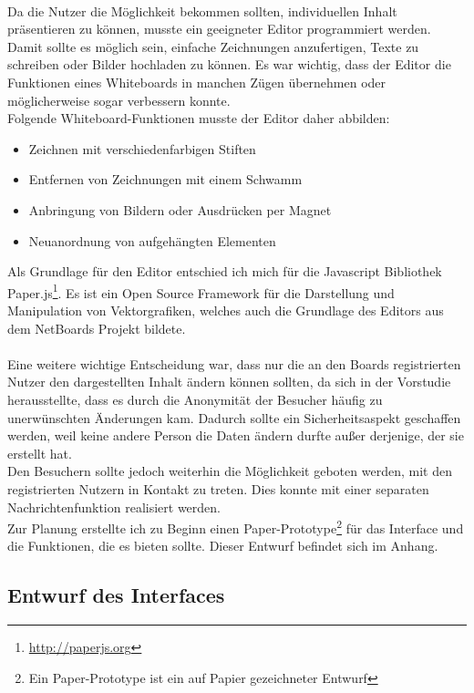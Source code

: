 \\
Da die Nutzer die Möglichkeit bekommen sollten, individuellen Inhalt präsentieren zu können, musste ein geeigneter Editor programmiert werden.
Damit sollte es möglich sein, einfache Zeichnungen anzufertigen, Texte zu schreiben oder Bilder hochladen zu können.
Es war wichtig, dass der Editor die Funktionen eines Whiteboards in manchen Zügen übernehmen oder möglicherweise sogar verbessern konnte.
\\
Folgende Whiteboard-Funktionen musste der Editor daher abbilden:
\begin{itemize}
  \item Zeichnen mit verschiedenfarbigen Stiften
  \item Entfernen von Zeichnungen mit einem Schwamm
  \item Anbringung von Bildern oder Ausdrücken per Magnet
  \item Neuanordnung von aufgehängten Elementen
\end{itemize}
Als Grundlage für den Editor entschied ich mich für die Javascript Bibliothek Paper.js\footnote{\url{http://paperjs.org}}.
Es ist ein Open Source Framework für die Darstellung und Manipulation von Vektorgrafiken, welches auch die Grundlage des Editors aus dem NetBoards Projekt bildete\cite{wood:2014}.
\\
\\
Eine weitere wichtige Entscheidung war, dass nur die an den Boards registrierten Nutzer den dargestellten Inhalt ändern können sollten, da sich in der Vorstudie herausstellte, dass es durch die Anonymität der Besucher häufig zu unerwünschten Änderungen kam.
Dadurch sollte ein Sicherheitsaspekt geschaffen werden, weil keine andere Person die Daten ändern durfte außer derjenige, der sie erstellt hat.
\\
Den Besuchern sollte jedoch weiterhin die Möglichkeit geboten werden, mit den registrierten Nutzern in Kontakt zu treten. Dies konnte mit einer separaten Nachrichtenfunktion realisiert werden.
\\
Zur Planung erstellte ich zu Beginn einen Paper-Prototype\footnote{Ein Paper-Prototype ist ein auf Papier gezeichneter Entwurf} für das Interface und die Funktionen, die es bieten sollte. Dieser Entwurf befindet sich im Anhang.










\subsection{Entwurf des Interfaces}\label{Entwurf des Interfaces}

